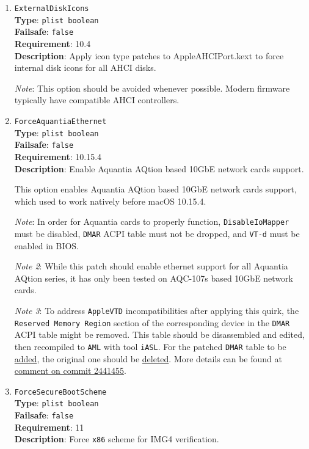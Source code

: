 \documentclass[]{article}
\begin{document}
\begin{enumerate}
\item
  \texttt{ExternalDiskIcons}\\
  \textbf{Type}: \texttt{plist\ boolean}\\
  \textbf{Failsafe}: \texttt{false}\\
  \textbf{Requirement}: 10.4\\
  \textbf{Description}: Apply icon type patches to AppleAHCIPort.kext to force
  internal disk icons for all AHCI disks.

  \emph{Note}: This option should be avoided whenever possible. Modern firmware
  typically have compatible AHCI controllers.

\item
  \texttt{ForceAquantiaEthernet}\\
  \textbf{Type}: \texttt{plist\ boolean}\\
  \textbf{Failsafe}: \texttt{false}\\
  \textbf{Requirement}: 10.15.4\\
  \textbf{Description}: Enable Aquantia AQtion based 10GbE network cards support.

  This option enables Aquantia AQtion based 10GbE network cards support,
  which used to work natively before macOS 10.15.4.

  \emph{Note}: In order for Aquantia cards to properly function,
  \texttt{DisableIoMapper} must be disabled, \texttt{DMAR} ACPI table must not be dropped,
  and \texttt{VT-d} must be enabled in BIOS.

  \emph{Note 2}: While this patch should enable ethernet support for all Aquantia AQtion series,
  it has only been tested on AQC-107s based 10GbE network cards.

  \emph{Note 3}: To address \texttt{AppleVTD} incompatibilities after applying this quirk,
  the \texttt{Reserved Memory Region} section of the corresponding device in the \texttt{DMAR}
  ACPI table might be removed. This table should be disassembled and edited, then recompiled to
  \texttt{AML} with tool \texttt{iASL}. For the patched \texttt{DMAR} table to be \hyperref[acpipropsadd]{added},
  the original one should be \hyperref[acpipropsdelete]{deleted}.
  More details can be found at
  \href{https://github.com/acidanthera/OpenCorePkg/commit/24414555f2c07e06a3674ec7a2aa1ce4860bbcc7#commitcomment-70530145}{comment on commit 2441455}.

\item
  \texttt{ForceSecureBootScheme}\\
  \textbf{Type}: \texttt{plist\ boolean}\\
  \textbf{Failsafe}: \texttt{false}\\
  \textbf{Requirement}: 11\\
  \textbf{Description}: Force \texttt{x86} scheme for IMG4 verification.


\end{enumerate}
\end{document}
